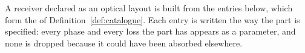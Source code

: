 
A receiver declared as an optical layout is built from the entries below,
which form the  of
Definition~\ref{def:catalogue}. Each
entry is written the way the part is specified: every phase and every loss
the part has appears as a parameter, and none is dropped because it could
have been absorbed elsewhere.

